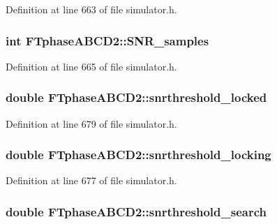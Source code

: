 Definition at line 663 of file simulator.h.

\hypertarget{classFTphaseABCD2_a4345058659842639ca5c1c01547996ed}{
\subsubsection[{SNR\_\-samples}]{\setlength{\rightskip}{0pt plus 5cm}int {\bf FTphaseABCD2::SNR\_\-samples}}}
\label{classFTphaseABCD2_a4345058659842639ca5c1c01547996ed}


Definition at line 665 of file simulator.h.

\hypertarget{classFTphaseABCD2_a19799b8de2087886785cba26137322d4}{
\subsubsection[{snrthreshold\_\-locked}]{\setlength{\rightskip}{0pt plus 5cm}double {\bf FTphaseABCD2::snrthreshold\_\-locked}}}
\label{classFTphaseABCD2_a19799b8de2087886785cba26137322d4}


Definition at line 679 of file simulator.h.

\hypertarget{classFTphaseABCD2_ae42732de117ba2a63c0d76c4b145353c}{
\subsubsection[{snrthreshold\_\-locking}]{\setlength{\rightskip}{0pt plus 5cm}double {\bf FTphaseABCD2::snrthreshold\_\-locking}}}
\label{classFTphaseABCD2_ae42732de117ba2a63c0d76c4b145353c}


Definition at line 677 of file simulator.h.

\hypertarget{classFTphaseABCD2_a51596f805f41cd40f7b601f71b0d5537}{
\subsubsection[{snrthreshold\_\-search}]{\setlength{\rightskip}{0pt plus 5cm}double {\bf FTphaseABCD2::snrthreshold\_\-search}}}
\label{classFTphaseABCD2_a51596f805f41cd40f7b601f71b0d5537}



